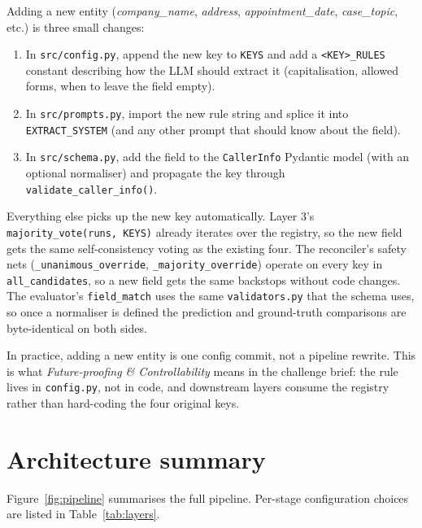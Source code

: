\documentclass[11pt,a4paper]{article}
\begin{document}
Adding a new entity (\textit{company\_name}, \textit{address},
\textit{appointment\_date}, \textit{case\_topic}, etc.) is three small
changes:

\begin{enumerate}
\item In \verb|src/config.py|, append the new key to \verb|KEYS| and
       add a \verb|<KEY>_RULES| constant describing how the LLM
       should extract it (capitalisation, allowed forms, when to
       leave the field empty).
\item In \verb|src/prompts.py|, import the new rule string and
       splice it into \verb|EXTRACT_SYSTEM| (and any other prompt
       that should know about the field).
\item In \verb|src/schema.py|, add the field to the
       \verb|CallerInfo| Pydantic model (with an optional
       normaliser) and propagate the key through
       \verb|validate_caller_info()|.
\end{enumerate}

Everything else picks up the new key automatically. Layer 3's
\verb|majority_vote(runs, KEYS)| already iterates over the registry,
so the new field gets the same self-consistency voting as the
existing four. The reconciler's safety nets (\verb|_unanimous_override|,
\verb|_majority_override|) operate on every key in
\verb|all_candidates|, so a new field gets the same backstops without
code changes. The evaluator's \verb|field_match| uses the same
\verb|validators.py| that the schema uses, so once a normaliser is
defined the prediction and ground-truth comparisons are byte-identical
on both sides.

In practice, adding a new entity is one config commit, not a
pipeline rewrite. This is what \emph{Future-proofing \&
Controllability} means in the challenge brief: the rule lives in
\verb|config.py|, not in code, and downstream layers consume the
registry rather than hard-coding the four original keys.

\section{Architecture summary}

Figure~\ref{fig:pipeline} summarises the full pipeline. Per-stage
configuration choices are listed in Table~\ref{tab:layers}.
\end{document}
